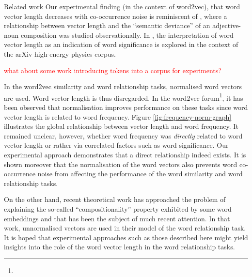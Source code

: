\documentclass{article} %
\begin{document}
\begin{section}{Related work}\label{related-work}
Our experimental finding (in the context of word2vec), that word vector length decreases with co-occurrence noise is reminiscent of \cite{vecchi-baroni-zamparelli2011}, where a relationship between vector length and the ``semantic deviance'' of an adjective-noun composition was studied observationally.
In \cite{schakel-wilson}, the interpretation of word vector length as an indication of word significance is explored in the context of the arXiv high-energy physics corpus.

\textcolor{red}{what about some work introducing tokens into a corpus for experiments?}

In the word2vec similarity and word relationship tasks, normalised word vectors are used.
Word vector length is thus disregarded.
In the word2vec forum\footnote{\googlegroup}, it has been observed that normalisation improves performance on these tasks since word vector length is related to word frequency.
Figure \ref{fig:frequency-norm-graph} illustrates the global relationship between vector length and word frequency.
It remained unclear, however, whether word frequency was \textit{directly} related to word vector length or rather via correlated factors such as word significance.
Our experimental approach demonstrates that a direct relationship indeed exists.
It is shown moreover that the normalisation of the word vectors also prevents word co-occurrence noise from affecting the performance of the word similarity and word relationship tasks.

On the other hand, recent theoretical work \cite{Arora2015} has approached the problem of explaining the so-called ``compositionality'' property exhibited by some word embeddings and that has been the subject of much recent attention.
In that work, unnormalised vectors are used in their model of the word relationship task.
It is hoped that experimental approaches such as those described here might yield insights into the role of the word vector length in the word relationship tasks.
\end{section}
\end{document}
